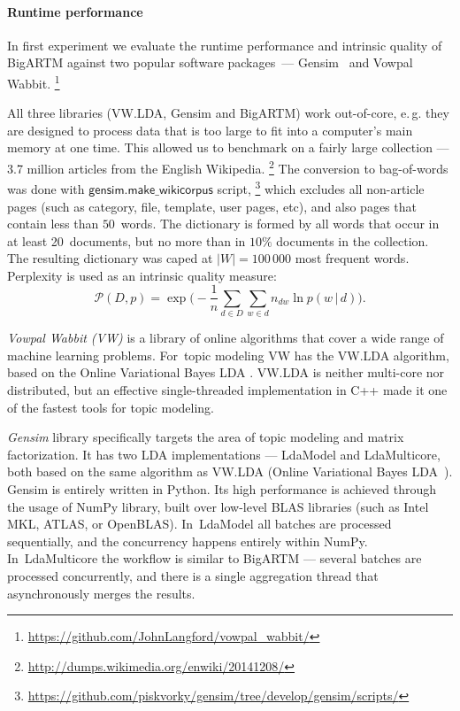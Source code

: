 \documentclass{sig-alternate-2013}
\newcommand{\cond}{\mspace{3mu}{|}\mspace{3mu}}
\newcommand{\kw}[1]{\textsf{#1}}
\begin{document}
\paragraph{Runtime performance}
In first experiment we evaluate the runtime performance and intrinsic quality of BigARTM
against two popular software packages~---
Gensim~\cite{rehurek10software}
and Vowpal Wabbit.%
\footnote{\url{https://github.com/JohnLangford/vowpal_wabbit/}}

All three libraries (VW.LDA, Gensim and BigARTM) work out-of-core,
e.\,g. they are designed to process data that is too large to fit into a computer's main memory at one time.
This allowed us to benchmark on a fairly large collection --- 3.7 million articles from the English Wikipedia.%
\footnote{\url{http://dumps.wikimedia.org/enwiki/20141208/}}
The conversion to bag-of-words was done with $\kw{gensim.make\_wikicorpus}$ script,%
\footnote{\url{https://github.com/piskvorky/gensim/tree/develop/gensim/scripts/}}
which excludes all non-article pages (such as category, file, template, user pages, etc),
and also pages that contain less than $50$~words.
The dictionary is formed by all words that occur in at least 20~documents,
but no more than in $10\%$ documents in the collection.
The resulting dictionary was caped at $|W| = 100\,000$ most frequent words.
Perplexity is used as an intrinsic quality measure:
\begin{equation}
    \label{eq:perplexity}
    \mathscr{P}(D, p) =
        \exp \biggl( - \frac{1}{n} \sum_{d \in D} \sum_{w \in d} n_{dw} \ln p(w \cond d) \biggr).
\end{equation}

\emph{Vowpal Wabbit (VW)} is a library
of online algorithms that cover a wide range of machine learning problems. %
For~topic modeling VW has the VW.LDA algorithm, based on the Online Variational Bayes LDA \cite{hoffman10online}.
VW.LDA is neither multi-core nor distributed,
but an effective single-threaded implementation in C++ made it one of the fastest tools for topic modeling.%

\emph{Gensim} library specifically targets the area of topic modeling and matrix factorization.
It has two LDA implementations --- LdaModel and LdaMulticore,
both based on the same algorithm as VW.LDA (Online Variational Bayes LDA~\cite{hoffman10online}).
Gensim is entirely written in Python. Its high performance is achieved through the usage of NumPy library,
built over low-level BLAS libraries (such as Intel MKL, ATLAS, or OpenBLAS).
In~LdaModel all batches are processed sequentially, and the concurrency happens entirely within NumPy. %
In~LdaMulticore the workflow is similar to \mbox{BigARTM} --- several batches are processed concurrently,
and there is a single aggregation thread that asynchronously merges the results.
\end{document}
